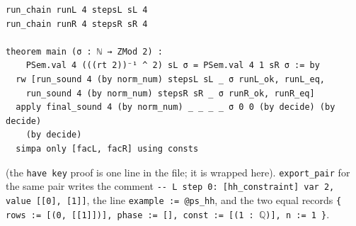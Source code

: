 \begin{example}
\begin{lstlisting}[style=lean]
run_chain runL 4 stepsL sL 4
run_chain runR 4 stepsR sR 4

theorem main (σ : ℕ → ZMod 2) :
    PSem.val 4 (((rt 2))⁻¹ ^ 2) sL σ = PSem.val 4 1 sR σ := by
  rw [run_sound 4 (by norm_num) stepsL sL _ σ runL_ok, runL_eq,
    run_sound 4 (by norm_num) stepsR sR _ σ runR_ok, runR_eq]
  apply final_sound 4 (by norm_num) _ _ _ _ σ 0 0 (by decide) (by decide)
    (by decide)
  simpa only [facL, facR] using consts
\end{lstlisting}
(the \textnormal{\texttt{have key}} proof is one line in the file; it is wrapped here). \textnormal{\texttt{export\_\allowbreak{}pair}} for the
same pair writes the comment \textnormal{\texttt{-{}-{} L step 0: [hh\_\allowbreak{}constraint] var 2,\allowbreak{} value [[0],\allowbreak{} [1]]}}, the line
\textnormal{\texttt{example := @ps\_\allowbreak{}hh}}, and the two equal records
\textnormal{\texttt{\{ rows := [(\allowbreak{}0,\allowbreak{} [[1]])],\allowbreak{} phase := [],\allowbreak{} const := [(\allowbreak{}1 : \ensuremath{\mathbb{Q}})],\allowbreak{} n := 1 \}}}.
\end{example}


